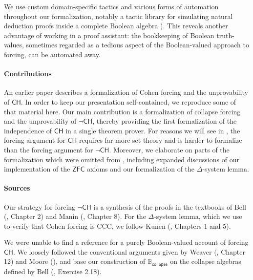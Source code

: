 \documentclass[sigplan,10pt,review, anonymous]{acmart}
\newcommand{\ZFC}{\mathsf{ZFC}}
\newcommand{\CH}{\mathsf{CH}}
\theoremstyle{definition}
\begin{document}
We use custom domain-specific tactics and various forms of automation throughout our formalization, notably a tactic library for simulating natural deduction proofs inside a complete Boolean algebra ).
This reveals another advantage of working in a proof assistant: the bookkeeping of Boolean truth-values, sometimes regarded as a tedious aspect of the Boolean-valued approach to forcing, can be automated away.

\paragraph{Contributions}
An earlier paper \cite{DBLP:conf/itp/HanD19} describes a formalization of Cohen forcing and the unprovability of \(\CH\). In order to keep our presentation self-contained, %
we reproduce some of that material here.
Our main contribution is a formalization of collapse forcing and the unprovability of \(\neg \CH\), thereby providing the first formalization of the independence of \(\CH\) in a single theorem prover. For reasons we will see in , the forcing argument for \(\CH\) requires far more set theory and is harder to formalize than the forcing argument for \(\neg \CH\). Moreover, we elaborate on parts of the formalization which were omitted from \cite{DBLP:conf/itp/HanD19}, including expanded discussions of our implementation of the \(\ZFC\) axioms and our formalization of the \(\Delta\)-system lemma.%

\paragraph{Sources}
Our strategy for forcing \(\neg \CH\) is a synthesis of the proofs in the textbooks of Bell (\cite{bell2011set}, Chapter 2) and Manin (\cite{manin2009course}, Chapter 8).
For the $\Delta$-system lemma, which we use to verify that Cohen forcing is CCC, we follow Kunen (\cite{kunen2014set}, Chapters 1 and 5).

We were unable to find a reference for a purely Boolean-valued account of forcing \(\CH\). We loosely followed the conventional arguments given by Weaver (\cite{weaver2014forcing}, Chapter 12) and Moore (\cite{moore2019method}), and base our construction of \(\mathbb{B}_{\mathsf{collapse}}\) on the collapse algebras defined by Bell (\cite{bell2011set}, Exercise 2.18).
\end{document}
